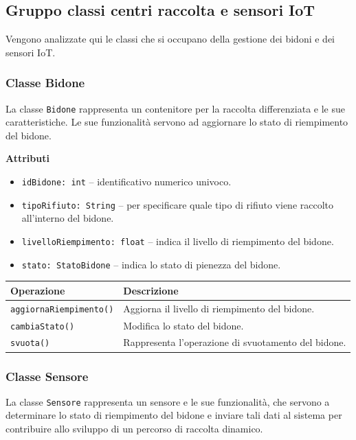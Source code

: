 \documentclass[12pt,a4paper]{article}
\begin{document}
\subsection{Gruppo classi centri raccolta e sensori IoT} 
Vengono analizzate qui le classi che si occupano della gestione dei bidoni e dei sensori IoT.

\subsubsection{Classe Bidone}
La classe \texttt{Bidone} rappresenta un contenitore per la raccolta differenziata e le sue caratteristiche.
Le sue funzionalità servono ad aggiornare lo stato di riempimento del bidone.

\textbf{Attributi}
\begin{itemize}
    \item \texttt{idBidone: int} -- identificativo numerico univoco.
    \item \texttt{tipoRifiuto: String} -- per specificare quale tipo di rifiuto viene raccolto all'interno del bidone.
    \item \texttt{livelloRiempimento: float} -- indica il livello di riempimento del bidone.
    \item \texttt{stato: StatoBidone} -- indica lo stato di pienezza del bidone.
\end{itemize}

\begin{table}[H]
\centering
\begin{tabularx}{\textwidth}{@{}lX@{}}
\toprule
\textbf{Operazione} & \textbf{Descrizione} \\ \midrule
\texttt{aggiornaRiempimento()} & Aggiorna il livello di riempimento del bidone. \\
\texttt{cambiaStato()} & Modifica lo stato del bidone. \\
\texttt{svuota()} & Rappresenta l'operazione di svuotamento del bidone. \\
\bottomrule
\end{tabularx}
\end{table}

\subsubsection{Classe Sensore}
La classe \texttt{Sensore} rappresenta un sensore e le sue funzionalità,
che servono a determinare lo stato di riempimento del bidone e inviare tali dati al sistema 
per contribuire allo sviluppo di un percorso di raccolta dinamico.
\end{document}
